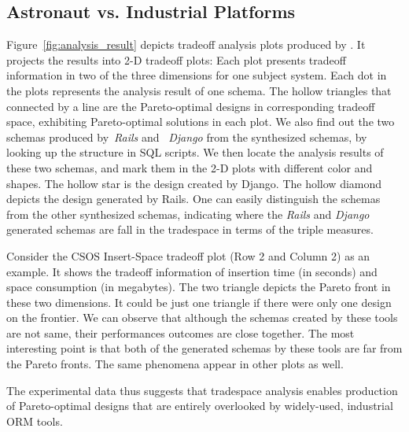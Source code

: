 \documentclass{sig-alternate}
\begin{document}
\subsection{Astronaut vs. Industrial Platforms} %
Figure~\ref{fig:analysis_result} depicts tradeoff analysis plots produced by \@approach.
It projects the results into 2-D tradeoff plots: Each plot presents tradeoff information in two of the three dimensions for one subject system. 
Each dot in the plots represents the analysis result of one schema. 
The hollow triangles that connected by a line are the Pareto-optimal designs in corresponding tradeoff space, exhibiting Pareto-optimal solutions in each plot. 
We also find out the two schemas produced by~{\em Rails} and ~{\em Django} from the synthesized schemas, by looking up the structure in SQL scripts. We then locate the analysis results of these two schemas, and mark them in the 2-D plots with different color and shapes. 
The hollow star is the design created by Django. The hollow diamond depicts the design generated by Rails.
One can easily distinguish the schemas from the other synthesized schemas, indicating where the {\em Rails} and {\em Django} generated schemas are fall in the tradespace in terms of the triple measures.


Consider the CSOS Insert-Space tradeoff plot (Row 2 and Column 2) as an example. It shows the tradeoff information of insertion time (in seconds) and space consumption (in megabytes). The two triangle depicts the Pareto front in these two dimensions. It could be just one triangle if there were only one design on the frontier. We can observe that although the schemas created by these tools are not same, their performances outcomes are close together. The most interesting point is that both of the generated schemas by these tools are far from the Pareto fronts. The same phenomena appear in other plots as well. 


The experimental data thus suggests that \@approach tradespace analysis enables production of Pareto-optimal designs that are entirely overlooked by widely-used, industrial ORM tools. 
 
 
\end{document}
